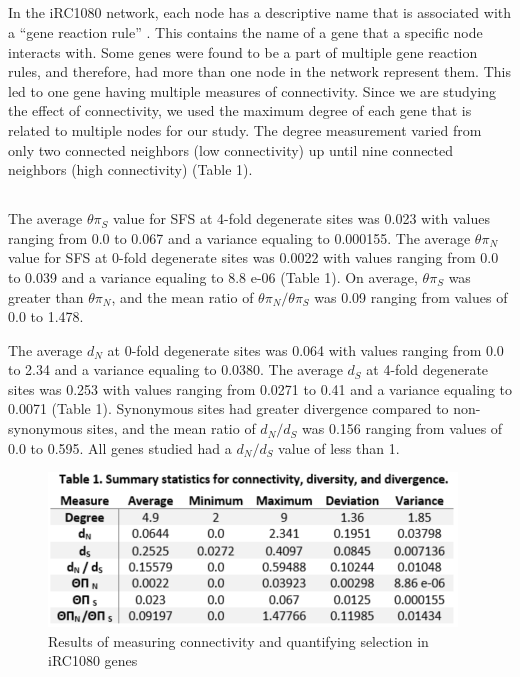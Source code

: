 \documentclass[letterpaper, 10 pt, conference]{ieeeconf}  %
\begin{document}
\subsection*{}
In the iRC1080 network, each node has a descriptive name that is associated with a “gene reaction rule” \cite{kldmfl}. This contains the name of a gene that a specific node interacts with. Some genes were found to be a part of multiple gene reaction rules, and therefore, had more than one node in the network represent them. This led to one gene having multiple measures of connectivity. Since we are studying the effect of connectivity, we used the maximum degree of each gene that is related to multiple nodes for our study. The degree measurement varied from only two connected neighbors (low connectivity) up until nine connected neighbors (high connectivity) (Table 1).

\subsection*{}
The average $\theta \pi_S$ value for SFS at 4-fold degenerate sites was 0.023 with values ranging from 0.0 to 0.067 and a variance equaling to 0.000155. The average $\theta \pi_N$ value for SFS at 0-fold degenerate sites was 0.0022 with values ranging from 0.0 to 0.039 and a variance equaling to 8.8 e-06 (Table 1). On average, $\theta \pi_S$ was greater than $\theta \pi_N$, and the mean ratio of  $\theta \pi_N/\theta \pi_S$ was 0.09 ranging from values of 0.0 to 1.478. 

\setlength{\parindent}{10ex}
The average $d_N$ at 0-fold degenerate sites was 0.064 with values ranging from 0.0 to 2.34 and a variance equaling to 0.0380. The average $d_S$ at 4-fold degenerate sites was 0.253 with values ranging from 0.0271 to 0.41 and a variance equaling to 0.0071 (Table 1). Synonymous sites had greater divergence compared to non-synonymous sites, and the mean ratio of $d_N/d_S$ was 0.156 ranging from values of 0.0 to 0.595. All genes studied had a $d_N/d_S$ value of less than 1. 

   \begin{figure}[thpb]
      \centering


      \includegraphics[scale=0.9]{newest_thesis_table.PNG}
   {\fontsize{7.5}{11}\selectfont Results of measuring connectivity and quantifying selection in iRC1080 genes}
      \label{hello i am testing}
   \end{figure}
\end{document}
